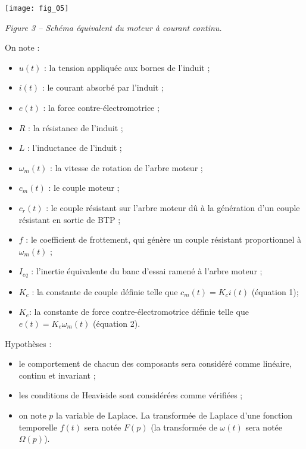 \begin{multicols}{2}
\begin{center}
\texttt{[image: fig\_05]}

\textit{Figure 3 -- Schéma équivalent du moteur à courant continu.}
\end{center}



On note :
\begin{itemize}
	\item $u(t)$ : la tension appliquée aux bornes de l'induit ;
	\item $i(t)$ : le courant absorbé par l'induit ;
	\item $e(t)$ : la force contre-électromotrice ;
	\item $R$ : la résistance de l'induit ;
	\item $L$ : l'inductance de l'induit ;
	\item $\omega_m (t)$ : la vitesse de rotation de l'arbre moteur ;
	\item $c_m (t)$ : le couple moteur ;
	\item $c_r (t)$ : le couple résistant sur l'arbre moteur dû à la génération d'un couple résistant en sortie de BTP ;
	\item $f$ : le coefficient de frottement, qui génère un couple résistant proportionnel à $\omega_m (t)$ ;
	\item $I_{eq}$ : l'inertie équivalente du banc d'essai ramené à l'arbre moteur ;
	\item $K_c$ : la constante de couple définie telle que
 $c_m (t)=K_c i(t)$	(équation 1);
	\item $K_e$: la constante de force contre-électromotrice définie telle que $e(t)=K_e \omega_m (t)$	(équation 2).
	\end{itemize}
%	
Hypothèses :
\begin{itemize}
\item le comportement de chacun des composants sera considéré comme linéaire, continu et invariant ;
\item les conditions de Heaviside sont considérées comme vérifiées ;
\item on note $p$ la variable de Laplace. La transformée de Laplace d'une fonction temporelle $f(t)$ sera notée $F(p)$ (la transformée de $\omega(t)$ sera notée $\Omega(p)$).
\end{itemize}

\fi


\end{multicols}
